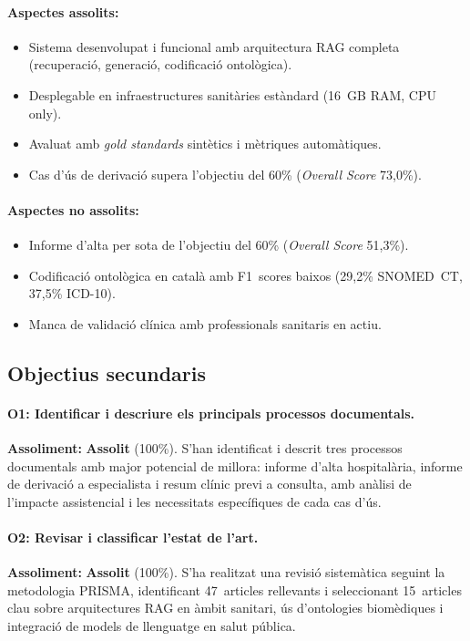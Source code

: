 \documentclass[CAT]{TFUOC}%
\begin{document}
\paragraph{Aspectes assolits:}
\begin{itemize}
    \item Sistema desenvolupat i funcional amb arquitectura RAG completa (recuperació, generació, codificació ontològica).
    \item Desplegable en infraestructures sanitàries estàndard (16~GB RAM, CPU only).
    \item Avaluat amb \textit{gold standards} sintètics i mètriques automàtiques.
    \item Cas d'ús de derivació supera l'objectiu del 60\% (\textit{Overall Score} 73,0\%).
\end{itemize}

\paragraph{Aspectes no assolits:}
\begin{itemize}
    \item Informe d'alta per sota de l'objectiu del 60\% (\textit{Overall Score} 51,3\%).
    \item Codificació ontològica en català amb F1~scores baixos (29,2\% SNOMED~CT, 37,5\% ICD-10).
    \item Manca de validació clínica amb professionals sanitaris en actiu.
\end{itemize}

\subsection{Objectius secundaris}

\paragraph{O1: Identificar i descriure els principals processos documentals.}
\textbf{Assoliment:} \textbf{Assolit} (100\%). S'han identificat i descrit tres processos documentals amb major potencial de millora: informe d'alta hospitalària, informe de derivació a especialista i resum clínic previ a consulta, amb anàlisi de l'impacte assistencial i les necessitats específiques de cada cas d'ús.

\paragraph{O2: Revisar i classificar l'estat de l'art.}
\textbf{Assoliment:} \textbf{Assolit} (100\%). S'ha realitzat una revisió sistemàtica seguint la metodologia PRISMA, identificant 47~articles rellevants i seleccionant 15~articles clau sobre arquitectures RAG en àmbit sanitari, ús d'ontologies biomèdiques i integració de models de llenguatge en salut pública.
\end{document}
